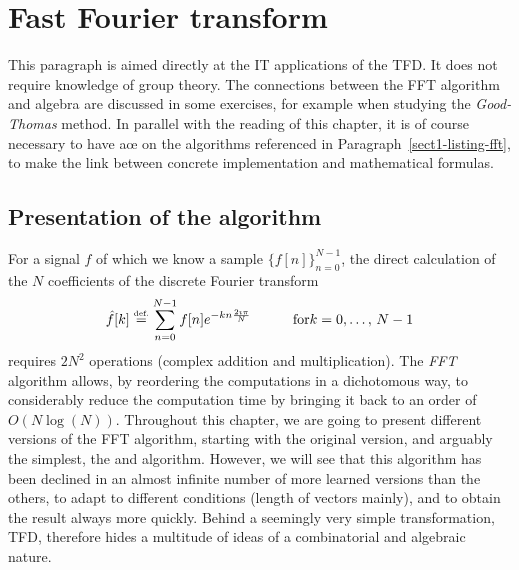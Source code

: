 \section{Fast Fourier transform}
\label{sect1-transform-fast} 
 
 
This paragraph is aimed directly at the IT applications of the TFD. It does not require knowledge of group theory. The connections between the FFT algorithm and algebra are discussed in some exercises, for example when studying the \textit{Good-Thomas}  method. In parallel with the reading of this chapter, it is of course necessary to have a{\oe} on the algorithms referenced in Paragraph~\ref{sect1-listing-fft}, to make the link between concrete implementation and mathematical formulas.
\subsection{Presentation of the algorithm}
\label{sect2-present-algo-fft} 
 
 
   For a signal $ f $ of which we know a sample $ \{f[n]\}_{n = 0}^{N -1} $, the direct calculation of the $N$ coefficients of the discrete Fourier transform
\begin{equation}
\label{eq-calcul-direct-tfd}
\hat{f}[k] \stackrel{\mbox{\upshape\tiny def.}}{=} \sum_{n = 0}^{N-1}{f[n] e^{- kn \frac{2 \imath \pi}{N}}} \quad \quad \quad \text{for} k = 0, \ldots, \, N-1
\end{equation}
requires $ 2 N^2 $ operations (complex addition and multiplication). The \textit{FFT} algorithm allows, by reordering the computations in a dichotomous way, to considerably reduce the computation time by bringing it back to an order of $ O(N \log (N)) $. Throughout this chapter, we are going to present different versions of the FFT algorithm, starting with the original version, and arguably the simplest, the  and  algorithm. However, we will see that this algorithm has been declined in an almost infinite number of more learned versions than the others, to adapt to different conditions (length of vectors mainly), and to obtain the result always more quickly. Behind a seemingly very simple transformation, TFD, therefore hides a multitude of ideas of a combinatorial and algebraic nature.
 
